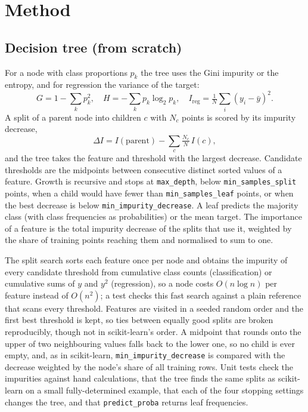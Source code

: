 \documentclass[10pt,twocolumn,a4paper]{article}
\begin{document}
\section{Method}
\subsection{Decision tree (from scratch)}
For a node with class proportions $p_k$ the tree uses the Gini impurity
or the entropy, and for regression the variance of the target:
\begin{equation}
  G = 1-\sum_k p_k^2,\quad
  H = -\sum_k p_k\log_2 p_k,\quad
  I_{\mathrm{reg}} = \tfrac{1}{N}\sum_i (y_i-\bar{y})^2 .
\end{equation}
A split of a parent node into children $c$ with $N_c$ points is scored by
its impurity decrease,
\begin{equation}
  \Delta I = I(\mathrm{parent}) - \sum_{c}\tfrac{N_c}{N}\,I(c),
\end{equation}
and the tree takes the feature and threshold with the largest decrease.
Candidate thresholds are the midpoints between consecutive distinct sorted
values of a feature. Growth is recursive and stops at \texttt{max\_depth},
below \texttt{min\_samples\_split} points, when a child would have fewer
than \texttt{min\_samples\_leaf} points, or when the best decrease is
below \texttt{min\_impurity\_decrease}. A leaf predicts the majority class
(with class frequencies as probabilities) or the mean target. The
importance of a feature is the total impurity decrease of the splits that
use it, weighted by the share of training points reaching them and
normalised to sum to one.

The split search sorts each feature once per node and obtains the impurity
of every candidate threshold from cumulative class counts (classification)
or cumulative sums of $y$ and $y^2$ (regression), so a node costs
$O(n\log n)$ per feature instead of $O(n^2)$; a test checks this fast
search against a plain reference that scans every threshold. Features are
visited in a seeded random order and the first best threshold is kept, so
ties between equally good splits are broken reproducibly, though not in
scikit-learn's order. A midpoint that rounds onto the upper of two
neighbouring values falls back to the lower one, so no child is ever
empty, and, as in scikit-learn, \texttt{min\_impurity\_decrease} is
compared with the decrease weighted by the node's share of all training
rows. Unit tests check the impurities against hand calculations, that the
tree finds the same splits as scikit-learn on a small fully-determined
example, that each of the four stopping settings changes the tree, and that
\texttt{predict\_proba} returns leaf frequencies.
\end{document}

